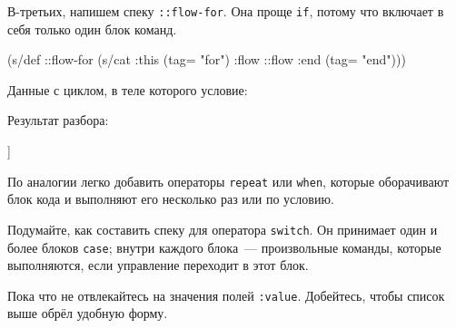 В-третьих, напишем спеку \texttt{::flow-for}. Она проще \texttt{if}, потому что
включает в себя только один блок команд.

\begin{english}
  \begin{clojure}
(s/def ::flow-for
  (s/cat :this (tag= "for")
         :flow ::flow
         :end (tag= "end")))
  \end{clojure}
\end{english}

Данные с циклом, в теле которого условие:

\begin{english}
  \begin{clojure}
  \end{clojure}
\end{english}

Результат разбора:

\begin{english}
  \begin{clojure}
[[:for
  {:this {:command "for"}
   :flow
   [[:if
     {:this {:command "if" :condition "..."}
      :flow [[:cmd {:command "print" :text "hello"}]]
      :end {:command "end"}}]]
   :end {:command "end"}}]]
  \end{clojure}
\end{english}

По аналогии легко добавить операторы \texttt{repeat} или \verb|when|, которые
оборачивают блок кода и выполняют его несколько раз или по условию.

Подумайте, как составить спеку для оператора \texttt{switch}. Он принимает один
и более блоков \verb|case|; внутри каждого блока~--- произвольные команды,
которые выполняются, если управление переходит в этот блок.

\begin{english}
  \begin{clojure}
  \end{clojure}
\end{english}

Пока что не отвлекайтесь на значения полей \verb|:value|. Добейтесь, чтобы
список выше обрёл удобную форму.


